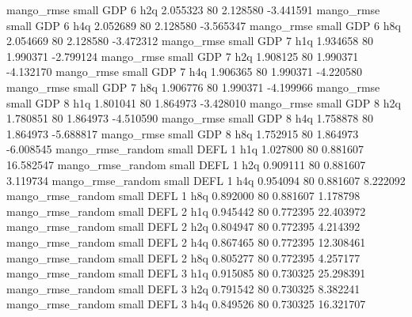        mango_rmse      small      GDP                 6                  h2q 2.055323 80       2.128580          -3.441591
       mango_rmse      small      GDP                 6                  h4q 2.052689 80       2.128580          -3.565347
       mango_rmse      small      GDP                 6                  h8q 2.054669 80       2.128580          -3.472312
       mango_rmse      small      GDP                 7                  h1q 1.934658 80       1.990371          -2.799124
       mango_rmse      small      GDP                 7                  h2q 1.908125 80       1.990371          -4.132170
       mango_rmse      small      GDP                 7                  h4q 1.906365 80       1.990371          -4.220580
       mango_rmse      small      GDP                 7                  h8q 1.906776 80       1.990371          -4.199966
       mango_rmse      small      GDP                 8                  h1q 1.801041 80       1.864973          -3.428010
       mango_rmse      small      GDP                 8                  h2q 1.780851 80       1.864973          -4.510590
       mango_rmse      small      GDP                 8                  h4q 1.758878 80       1.864973          -5.688817
       mango_rmse      small      GDP                 8                  h8q 1.752915 80       1.864973          -6.008545
mango_rmse_random      small     DEFL                 1                  h1q 1.027800 80       0.881607          16.582547
mango_rmse_random      small     DEFL                 1                  h2q 0.909111 80       0.881607           3.119734
mango_rmse_random      small     DEFL                 1                  h4q 0.954094 80       0.881607           8.222092
mango_rmse_random      small     DEFL                 1                  h8q 0.892000 80       0.881607           1.178798
mango_rmse_random      small     DEFL                 2                  h1q 0.945442 80       0.772395          22.403972
mango_rmse_random      small     DEFL                 2                  h2q 0.804947 80       0.772395           4.214392
mango_rmse_random      small     DEFL                 2                  h4q 0.867465 80       0.772395          12.308461
mango_rmse_random      small     DEFL                 2                  h8q 0.805277 80       0.772395           4.257177
mango_rmse_random      small     DEFL                 3                  h1q 0.915085 80       0.730325          25.298391
mango_rmse_random      small     DEFL                 3                  h2q 0.791542 80       0.730325           8.382241
mango_rmse_random      small     DEFL                 3                  h4q 0.849526 80       0.730325          16.321707

